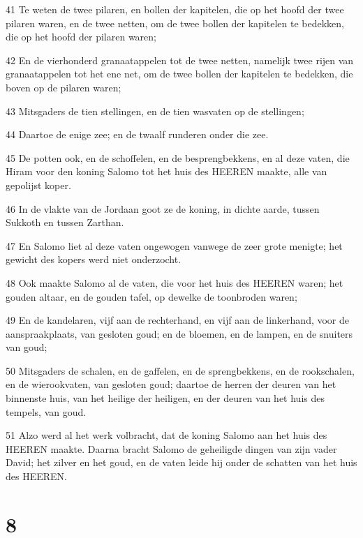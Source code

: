 \par 41 Te weten de twee pilaren, en bollen der kapitelen, die op het hoofd der twee pilaren waren, en de twee netten, om de twee bollen der kapitelen te bedekken, die op het hoofd der pilaren waren;
\par 42 En de vierhonderd granaatappelen tot de twee netten, namelijk twee rijen van granaatappelen tot het ene net, om de twee bollen der kapitelen te bedekken, die boven op de pilaren waren;
\par 43 Mitsgaders de tien stellingen, en de tien wasvaten op de stellingen;
\par 44 Daartoe de enige zee; en de twaalf runderen onder die zee.
\par 45 De potten ook, en de schoffelen, en de besprengbekkens, en al deze vaten, die Hiram voor den koning Salomo tot het huis des HEEREN maakte, alle van gepolijst koper.
\par 46 In de vlakte van de Jordaan goot ze de koning, in dichte aarde, tussen Sukkoth en tussen Zarthan.
\par 47 En Salomo liet al deze vaten ongewogen vanwege de zeer grote menigte; het gewicht des kopers werd niet onderzocht.
\par 48 Ook maakte Salomo al de vaten, die voor het huis des HEEREN waren; het gouden altaar, en de gouden tafel, op dewelke de toonbroden waren;
\par 49 En de kandelaren, vijf aan de rechterhand, en vijf aan de linkerhand, voor de aanspraakplaats, van gesloten goud; en de bloemen, en de lampen, en de snuiters van goud;
\par 50 Mitsgaders de schalen, en de gaffelen, en de sprengbekkens, en de rookschalen, en de wierookvaten, van gesloten goud; daartoe de herren der deuren van het binnenste huis, van het heilige der heiligen, en der deuren van het huis des tempels, van goud.
\par 51 Alzo werd al het werk volbracht, dat de koning Salomo aan het huis des HEEREN maakte. Daarna bracht Salomo de geheiligde dingen van zijn vader David; het zilver en het goud, en de vaten leide hij onder de schatten van het huis des HEEREN.

\chapter{8}


